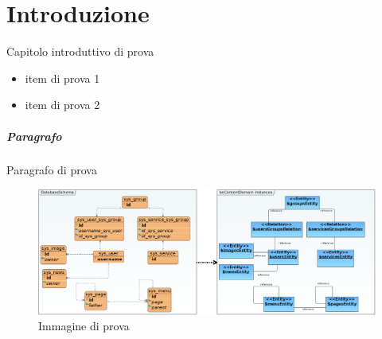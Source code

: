 \chapter{Introduzione}
Capitolo introduttivo di prova
\begin{itemize}
 \item item di prova 1
 \item item di prova 2
\end{itemize}

\paragraph{Paragrafo}
 Paragrafo di prova
 \begin{figure}[h!]
	    \centering
	    \includegraphics[width=\textwidth,keepaspectratio=true]{capitoli/imgs/SystemDomain.png}
	    \caption{Immagine di prova}
\end{figure}